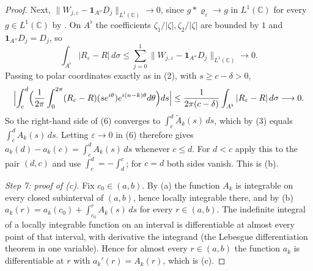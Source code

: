 \begin{proof}
Next, $\|W_{j,\varepsilon}-\mathbf1_{A''}D_j\|_{L^{1}(\mathbb{C})}\to0$, since
$g*\varrho_\varepsilon\to g$ in $L^{1}(\mathbb{C})$ for every
$g\in L^{1}(\mathbb{C})$ by .  On $A^\flat$ the coefficients
$\zeta_1/|\zeta|,\zeta_2/|\zeta|$ are bounded by $1$ and
$\mathbf1_{A''}D_j=D_j$, so
\[
  \int_{A^\flat}|R_\varepsilon-R|\,d\sigma
  \le\sum_{j=0}^1\|W_{j,\varepsilon}-\mathbf1_{A''}D_j\|_{L^{1}(\mathbb{C})}
  \longrightarrow0 .
\]
Passing to polar coordinates exactly as in (2), with $s\ge c-\delta>0$,
\[
  \Bigl|\int_c^d\Bigl(\frac1{2\pi}\int_0^{2\pi}
    (R_\varepsilon-R)(se^{i\theta})e^{i(n-k)\theta}d\theta\Bigr)ds\Bigr|
  \le\frac1{2\pi(c-\delta)}\int_{A^\flat}|R_\varepsilon-R|\,d\sigma
  \longrightarrow0 .
\]
So the right-hand side of (6) converges to
$\int_c^d\widetilde A_k(s)\,ds$, which by (3) equals $\int_c^dA_k(s)\,ds$.
Letting $\varepsilon\to0$ in (6) therefore gives
$a_k(d)-a_k(c)=\int_c^dA_k(s)\,ds$ whenever $c\le d$.  For $d<c$ apply this to
the pair $(d,c)$ and use $\int_c^d=-\int_d^c$; for $c=d$ both sides vanish.
This is (b).

\emph{Step 7: proof of (c).}  Fix $c_0\in(a,b)$.  By (a) the function $A_k$ is
integrable on every closed subinterval of $(a,b)$, hence locally integrable
there, and by (b) $a_k(r)=a_k(c_0)+\int_{c_0}^rA_k(s)\,ds$ for every
$r\in(a,b)$.  The indefinite integral of a locally integrable function on an
interval is differentiable at almost every point of that interval, with
derivative the integrand (the Lebesgue differentiation theorem in one
variable).  Hence for almost every $r\in(a,b)$ the function $a_k$ is
differentiable at $r$ with $a_k'(r)=A_k(r)$, which is (c).


\end{proof}
